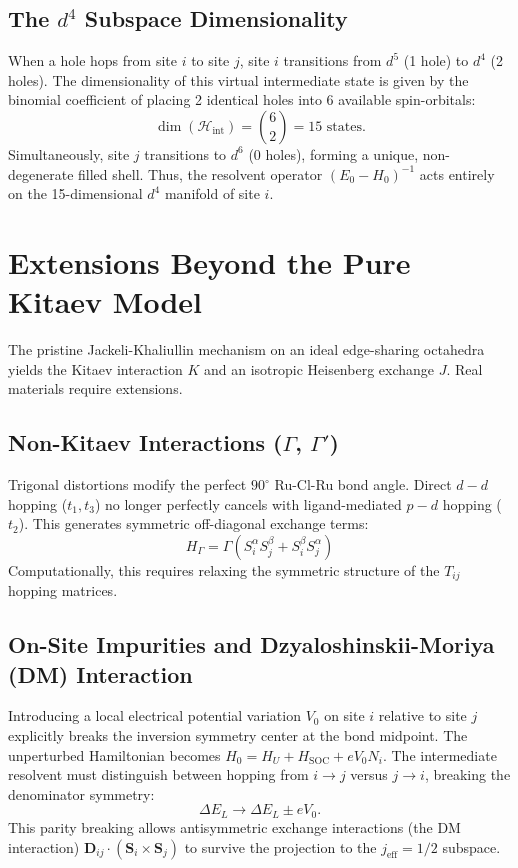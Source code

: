 \documentclass[11pt, a4paper]{article}
\begin{document}
\subsection{The $d^4$ Subspace Dimensionality}
When a hole hops from site $i$ to site $j$, site $i$ transitions from $d^5$ (1 hole) to $d^4$ (2 holes). The dimensionality of this virtual intermediate state is given by the binomial coefficient of placing 2 identical holes into 6 available spin-orbitals:
\begin{equation}
\dim(\mathcal{H}_{\text{int}}) = \binom{6}{2} = 15 \text{ states}.
\end{equation}
Simultaneously, site $j$ transitions to $d^6$ (0 holes), forming a unique, non-degenerate filled shell. Thus, the resolvent operator $(E_0 - H_0)^{-1}$ acts entirely on the 15-dimensional $d^4$ manifold of site $i$.

\section{Extensions Beyond the Pure Kitaev Model}

The pristine Jackeli-Khaliullin mechanism on an ideal edge-sharing octahedra yields the Kitaev interaction $K$ and an isotropic Heisenberg exchange $J$. Real materials require extensions.

\subsection{Non-Kitaev Interactions ($\Gamma$, $\Gamma'$)}
Trigonal distortions modify the perfect $90^\circ$ Ru-Cl-Ru bond angle. Direct $d-d$ hopping ($t_1, t_3$) no longer perfectly cancels with ligand-mediated $p-d$ hopping ($t_2$). This generates symmetric off-diagonal exchange terms:
\begin{equation}
H_{\Gamma} = \Gamma (S_i^\alpha S_j^\beta + S_i^\beta S_j^\alpha)
\end{equation}
Computationally, this requires relaxing the symmetric structure of the $T_{ij}$ hopping matrices.

\subsection{On-Site Impurities and Dzyaloshinskii-Moriya (DM) Interaction}
Introducing a local electrical potential variation $V_0$ on site $i$ relative to site $j$ explicitly breaks the inversion symmetry center at the bond midpoint. 
The unperturbed Hamiltonian becomes $H_0 = H_U + H_{\text{SOC}} + eV_0 N_i$. The intermediate resolvent must distinguish between hopping from $i \to j$ versus $j \to i$, breaking the denominator symmetry:
\begin{equation}
\Delta E_L \longrightarrow \Delta E_L \pm eV_0.
\end{equation}
This parity breaking allows antisymmetric exchange interactions (the DM interaction) $\bm{D}_{ij} \cdot (\bm{S}_i \times \bm{S}_j)$ to survive the projection to the $j_{\text{eff}}=1/2$ subspace.
\end{document}
